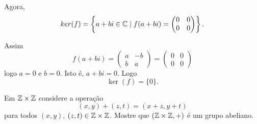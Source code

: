 \documentclass[12pt]{article}
\begin{document}
Agora,
\[
	ker(f) = \left\{a + bi \in \mathbb{C} \mid f(a + bi) = \begin{pmatrix}
		0 & 0\\
		0 & 0
	\end{pmatrix}\right\}.
\]

Assim
\[
	f(a + bi) = \begin{pmatrix}
		a & -b\\
		b & a
	\end{pmatrix} = \begin{pmatrix}
		0 & 0\\
		0 & 0
	\end{pmatrix}
\]
logo $a = 0$ e $b = 0$. Isto é, $a + bi = 0$. Logo 
\[
	\ker(f) = \{0\}.
\]

\vspace{1cm}

\questao Em $\mathbb{Z} \times\mathbb{Z}$ considere a operação
\[
	(x, y) + (z, t) = (x + z, y + t)
\]
para todos $(x,y)$, $(z,t) \in \mathbb{Z}\times\mathbb{Z}$. Mostre que $(\mathbb{Z}\times\mathbb{Z}, +)$ é um grupo abeliano.
\end{document}
